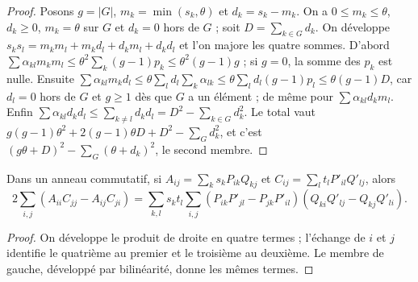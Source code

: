 \begin{proof}
Posons $g = |G|$, $m_k = \min(s_k, \theta)$ et $d_k = s_k - m_k$. On a $0 \leq m_k \leq \theta$, $d_k \geq 0$, $m_k = \theta$ sur $G$ et $d_k = 0$ hors de $G$ ; soit $D = \sum_{k \in G} d_k$. On développe $s_k s_l = m_km_l + m_kd_l + d_km_l + d_kd_l$ et l'on majore les quatre sommes. D'abord $\sum \alpha_{kl} m_k m_l \leq \theta^2 \sum_k (g-1)p_k \leq \theta^2 (g-1) g$ ; si $g = 0$, la somme des $p_k$ est nulle. Ensuite $\sum \alpha_{kl} m_k d_l \leq \theta \sum_l d_l \sum_k \alpha_{lk} \leq \theta \sum_l d_l (g-1) p_l \leq \theta (g-1) D$, car $d_l = 0$ hors de $G$ et $g \geq 1$ dès que $G$ a un élément ; de même pour $\sum \alpha_{kl} d_k m_l$. Enfin $\sum \alpha_{kl} d_k d_l \leq \sum_{k \neq l} d_k d_l = D^2 - \sum_{k \in G} d_k^2$. Le total vaut $g(g-1)\theta^2 + 2(g-1)\theta D + D^2 - \sum_G d_k^2$, et c'est $(g\theta + D)^2 - \sum_G (\theta + d_k)^2$, le second membre.
\end{proof}

\begin{lemme}\label{lem:1-binet}
Dans un anneau commutatif, si $A_{ij} = \sum_k s_k P_{ik} Q_{kj}$ et $C_{ij} = \sum_l t_l P'_{il} Q'_{lj}$, alors
\[
  2 \sum_{i,j} (A_{ii}C_{jj} - A_{ij}C_{ji}) = \sum_{k,l} s_k t_l \sum_{i,j} (P_{ik}P'_{jl} - P_{jk}P'_{il})(Q_{ki}Q'_{lj} - Q_{kj}Q'_{li}).
\]
\end{lemme}

\begin{proof}
On développe le produit de droite en quatre termes ; l'échange de $i$ et $j$ identifie le quatrième au premier et le troisième au deuxième. Le membre de gauche, développé par bilinéarité, donne les mêmes termes.
\end{proof}

